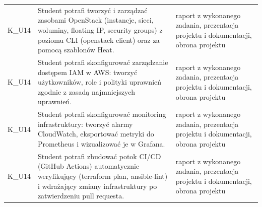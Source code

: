\documentclass[12pt, a4paper]{article}
\begin{document}
{\begin{longtable}{m{1.6cm}m{9.0cm}m{4.2cm}}
  \rowcolor{tableRowLight} K\_U14 & Student potrafi tworzyć i zarządzać zasobami OpenStack (instancje, sieci, woluminy, floating IP, security groups) z poziomu CLI (openstack client) oraz za pomocą szablonów Heat. & raport z wykonanego zadania, prezentacja projektu i dokumentacji, obrona projektu \\
  \rowcolor{tableRowAlt} K\_U14 & Student potrafi skonfigurować zarządzanie dostępem IAM w AWS: tworzyć użytkowników, role i polityki uprawnień zgodnie z zasadą najmniejszych uprawnień. & raport z wykonanego zadania, prezentacja projektu i dokumentacji, obrona projektu \\
  \rowcolor{tableRowLight} K\_U14 & Student potrafi skonfigurować monitoring infrastruktury: tworzyć alarmy CloudWatch, eksportować metryki do Prometheus i wizualizować je w Grafana. & raport z wykonanego zadania, prezentacja projektu i dokumentacji, obrona projektu \\
  \rowcolor{tableRowAlt} K\_U14 & Student potrafi zbudować potok CI/CD (GitHub Actions) automatycznie weryfikujący (terraform plan, ansible-lint) i wdrażający zmiany infrastruktury po zatwierdzeniu pull requesta. & raport z wykonanego zadania, prezentacja projektu i dokumentacji, obrona projektu \\
\bottomrule
\end{longtable}}
\end{document}
